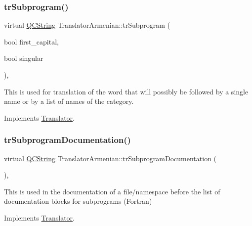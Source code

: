 \mbox{\label{class_translator_armenian_a57568fd50f93e289711e3c4853186028}} 
\subsubsection{\texorpdfstring{trSubprogram()}{trSubprogram()}}
{\footnotesize\ttfamily virtual \mbox{\hyperlink{class_q_c_string}{Q\+C\+String}} Translator\+Armenian\+::tr\+Subprogram (\begin{DoxyParamCaption}\item[{bool}]{first\+\_\+capital,  }\item[{bool}]{singular }\end{DoxyParamCaption})\hspace{0.3cm}{\ttfamily [inline]}, {\ttfamily [virtual]}}

This is used for translation of the word that will possibly be followed by a single name or by a list of names of the category. 

Implements \mbox{\hyperlink{class_translator}{Translator}}.

\mbox{\label{class_translator_armenian_a209a3ee8fbb276a8caa203d8adfc6a63}} 
\subsubsection{\texorpdfstring{trSubprogramDocumentation()}{trSubprogramDocumentation()}}
{\footnotesize\ttfamily virtual \mbox{\hyperlink{class_q_c_string}{Q\+C\+String}} Translator\+Armenian\+::tr\+Subprogram\+Documentation (\begin{DoxyParamCaption}{ }\end{DoxyParamCaption})\hspace{0.3cm}{\ttfamily [inline]}, {\ttfamily [virtual]}}

This is used in the documentation of a file/namespace before the list of documentation blocks for subprograms (Fortran) 

Implements \mbox{\hyperlink{class_translator}{Translator}}.

\mbox{\label{class_translator_armenian_a0178158d43660f3fd50275cce4f58ba9}} 
